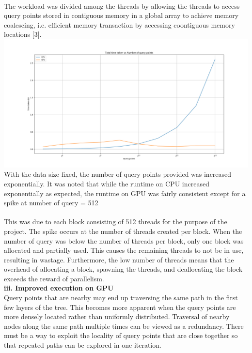 \documentclass{article}
\begin{document}
\normalsize
~\\
The workload was divided among the threads by allowing the threads to access query points stored in contiguous memory in a global array to achieve memory coalescing, i.e. efficient memory transaction by accessing coontiguous memory locations [3].\\
\includegraphics[scale=0.38]{../batchtree/graphs/cpu_gpu_total}
\\
With the data size fixed, the number of query points provided was increased exponentially. It was noted that while the runtime on CPU increased exponentially as expected, the runtime on GPU was fairly consistent except for a spike at number of query = 512\\
\\
This was due to each block consisting of 512 threads for the purpose of the project. The spike occurs at the number of threads created per block. When the number of query was below the number of threads per block, only one block was allocated and partially used. This causes the remaining threads to not be in use, resulting in wastage. Furthermore, the low number of threads means that the overhead of allocating a block, spawning the threads, and deallocating the block exceeds the reward of parallelism.\\
\newpage\noindent
\textbf{iii. Improved execution on GPU}\\
Query points that are nearby may end up traversing the same path in the first few layers of the tree. This becomes more apparent when the query points are more densely located rather than uniformly distributed. Traversal of nearby nodes along the same path multiple times can be viewed as a redundancy. There must be a way to exploit the locality of query points that are close together so that repeated paths can be explored in one iteration.\\
\end{document}
